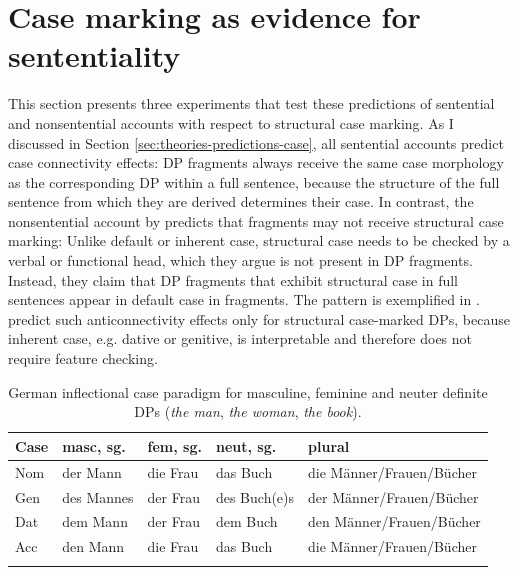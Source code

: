 \section{Case marking as evidence for sententiality}
\label{sec:experiments-case}

This section presents three experiments that test these predictions of sentential and nonsentential accounts with respect to structural case marking. As I discussed in Section \ref{sec:theories-predictions-case}, all sentential accounts predict case connectivity effects: DP fragments always receive the same case morphology as the corresponding DP within a full sentence, because the structure of the full sentence from which they are derived determines their case. In contrast, the nonsentential account by \citet{barton.progovac2005} predicts that fragments may not receive structural case marking: Unlike default or inherent case, structural case needs to be checked by a verbal or functional head, which they argue is not present in DP fragments. Instead, they claim that DP fragments that exhibit structural case in full sentences appear in default case in fragments. The pattern is exemplified in \Next. \citet{barton.progovac2005} predict such anticonnectivity effects only for structural case-marked DPs, because inherent case, e.g. dative or genitive, is interpretable and therefore does not require feature checking.

\begin{table}[t]
\begin{tabular}{l l l l l}
\lsptoprule
Case & masc, sg. & fem, sg. & neut, sg. & plural\\
\midrule
Nom & der Mann & die Frau & das Buch & die Männer/Frauen/Bücher\\
Gen & des Mannes & der Frau & des Buch(e)s & der Männer/Frauen/Bücher\\
Dat & dem Mann & der Frau & dem Buch & den Männer/Frauen/Bücher\\
Acc & den Mann & die Frau & das Buch &  die Männer/Frauen/Bücher\\
\lspbottomrule
\end{tabular}
\caption{German inflectional case paradigm for masculine, feminine and neuter definite DPs (\textit{the man}, \textit{the woman}, \textit{the book}).\label{tab:case-paradigm-german}}
\end{table}

